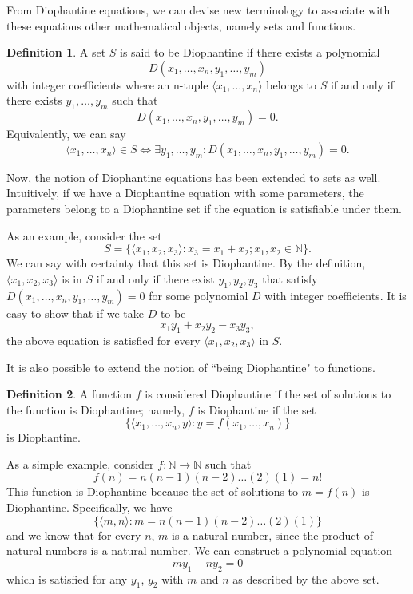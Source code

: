 \documentclass[12pt]{amsart}
\theoremstyle{definition}
\newtheorem{definition}{Definition}[section]
\theoremstyle{case}
\begin{document}
	From Diophantine equations, we can devise new terminology to associate with these equations other mathematical objects, namely sets and functions.	
	
	\begin{definition}
		A set $S$ is said to be Diophantine if there exists a polynomial $$D(x_1, \dots, x_n, y_1, \dots, y_m)$$ with integer coefficients where an n-tuple $\langle x_1, \dots, x_n \rangle$ belongs to $S$ if and only if there exists $y_1, \dots, y_m$ such that 
		$$ D(x_1, \dots, x_n, y_1, \dots, y_m) = 0 . $$
		Equivalently, we can say
		$$ \langle x_1, \dots, x_n \rangle \in S \iff \exists y_1, \dots, y_m : D(x_1, \dots, x_n, y_1, \dots, y_m) = 0 . $$
	\end{definition}
	Now, the notion of Diophantine equations has been extended to sets as well. Intuitively, if we have a Diophantine equation with some parameters, the parameters belong to a Diophantine set if the equation is satisfiable under them.

	As an example, consider the set 
	$$S = \{ \langle x_1, x_2, x_3 \rangle : x_3 = x_1 + x_2; x_1, x_2 \in \mathbb{N}\} . $$
	We can say with certainty that this set is Diophantine. By the definition, $\langle x_1, x_2, x_3 \rangle$ is in $S$ if and only if there exist $y_1, y_2, y_3$ that satisfy $ D(x_1, \dots, x_n, y_1, \dots, y_m) = 0$ for some polynomial $D$ with integer coefficients. It is easy to show that if we take $D$ to be
	$$x_1y_1 + x_2y_2 - x_3y_3 ,$$
	the above equation is satisfied for every $\langle x_1, x_2, x_3 \rangle$ in $S$.	
	
	It is also possible to extend the notion of ``being Diophantine" to functions.
	
	\begin{definition}
		A function $f$ is considered Diophantine if the set of solutions to the function is Diophantine; namely, $f$ is Diophantine if the set
		$$\{ \langle x_1, \dots, x_n, y \rangle : y = f(x_1, \dots, x_n) \}$$
		is Diophantine.
	\end{definition}
	
	As a simple example, consider $f: \mathbb{N} \rightarrow \mathbb{N}$ such that
	$$ f(n) = n(n-1)(n-2)\dots(2)(1) = n! $$
	This function is Diophantine because the set of solutions to $m = f(n)$ is Diophantine. Specifically, we have
	$$ \{ \langle m, n \rangle : m = n(n-1)(n-2)\dots(2)(1)\} $$
	and we know that for every $n$, $m$ is a natural number, since the product of natural numbers is a natural number. We can construct a polynomial equation
	$$ my_1 - ny_2 = 0 $$
	which is satisfied for any $y_1$, $y_2$ with $m$ and $n$ as described by the above set.
	
	
	
	
	
	
	
	
	
	
	
	
	
	
	
	
	
	
	
	
	
\end{document}
